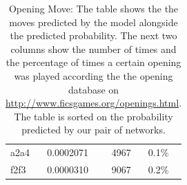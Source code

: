 \begin{table}[]
\begin{tabular}{@{}llll@{}}
a2a4 & 0.0002071             & 4967                   & 0.1\%              \\
f2f3 & 0.0000310             & 9067                   & 0.2\%              \\ 
\bottomrule
\end{tabular}
\caption[Moves generated for initial board position]{Opening Move: The table 
shows the the 
moves predicted by the model alongside the predicted probability. The next two 
columns show the number of times and the percentage of times a certain opening 
was played according the the opening database on 
\url{http://www.ficsgames.org/openings.html}. The table is sorted on 
the probability predicted by our pair of networks.}
\label{table:initialboard}
\end{table}
